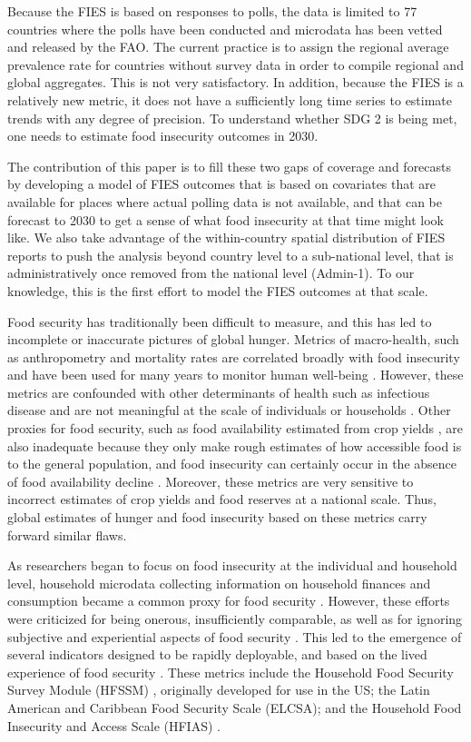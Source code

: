 \documentclass{article}
\begin{document}
Because the FIES is based on responses to polls, the data is limited to 77 countries where the polls have been conducted and microdata has been vetted and released by the FAO. The current practice is to assign the regional average prevalence rate for countries without survey data in order to compile regional and global aggregates. This is not very satisfactory. In addition, because the FIES is a relatively new metric, it does not have a sufficiently long time series to estimate trends with any degree of precision. To understand whether SDG 2 is being met, one needs to estimate food insecurity outcomes in 2030. 

The contribution of this paper is to fill these two gaps of coverage and forecasts by developing a model of FIES outcomes that is based on covariates that are available for places where actual polling data is not available, and that can be forecast to 2030 to get a sense of what food insecurity at that time might look like. We also take advantage of the within-country spatial distribution of FIES reports to push the analysis beyond country level to a sub-national level, that is administratively once removed from the national level (Admin-1). To our knowledge, this is the first effort to model the FIES outcomes at that scale.

Food security has traditionally been difficult to measure, and this has led to incomplete or inaccurate pictures of global hunger.  Metrics of macro-health, such as anthropometry and mortality rates are correlated broadly with food insecurity and have been used for many years to monitor human well-being \citep{Puffer1973, Habicht1974}.  However, these metrics are confounded with other determinants of health such as infectious disease and are not meaningful at the scale of individuals or households \citep{Perumal2018}.  Other proxies for food security, such as food availability estimated from crop yields \citep{Maxwell1992}, are also inadequate because they only make rough estimates of how accessible food is to the general population, and food insecurity can certainly occur in the absence of food availability decline \citep{Sen1983}.  Moreover, these metrics are very sensitive to incorrect estimates of crop yields and food reserves at a national scale.  Thus, global estimates of hunger and food insecurity based on these metrics carry forward similar flaws.

As researchers began to focus on food insecurity at the individual and household level, household microdata collecting information on household finances and consumption became a common proxy for food security \citep{Haddad1994}.  However, these efforts were criticized for being onerous, insufficiently comparable, as well as for ignoring subjective and experiential aspects of food security \citep{Maxwell1996}.  This led to the emergence of several indicators designed to be rapidly deployable, and based on the lived experience of food security \citep{Jones2013}.  These metrics include the Household Food Security Survey Module (HFSSM) \citep{kennedy2005keynote}, originally developed for use in the US; the Latin American and Caribbean Food Security Scale (ELCSA); and the Household Food Insecurity and Access Scale (HFIAS) \citep{Coates2007}.
\end{document}
